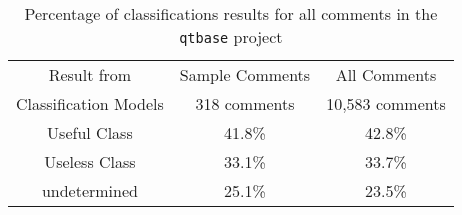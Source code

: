 \begin{table}[!t]
\caption{Percentage of classifications results for all comments in the \texttt{qtbase} project }
\small
\centering
\def\arraystretch{1.2}
\begin{tabular}{c|c|c}
\hline

Result from & Sample Comments   &  All Comments \\ \cline{2-3}
Classification Models &  318 comments  & 10,583 comments \\ \hline \hline
Useful Class  & 41.8\% & 42.8\% \\
Useless Class   & 33.1\%  & 33.7\% \\
undetermined  & 25.1\% & 23.5\% \\ \hline
\end{tabular}
\label{tb:percent}
\end{table}




